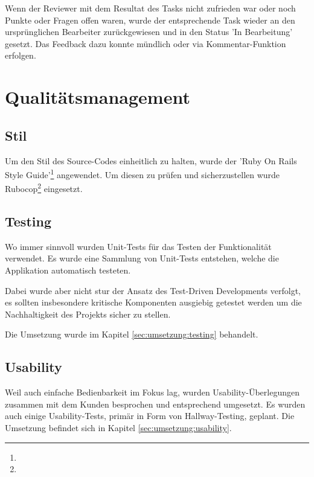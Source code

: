 Wenn der Reviewer mit dem Resultat des Tasks nicht zufrieden war oder noch Punkte oder Fragen offen waren, wurde der entsprechende Task wieder an den ursprünglichen Bearbeiter zurückgewiesen und in den Status 'In Bearbeitung' gesetzt. Das Feedback dazu konnte mündlich oder via Kommentar-Funktion erfolgen.

\section{Qualitätsmanagement}

\subsection*{Stil}

Um den Stil des Source-Codes einheitlich zu halten, wurde der 'Ruby On Rails Style Guide'\footnote{} angewendet. Um diesen zu prüfen und sicherzustellen wurde Rubocop\footnote{} eingesetzt.

\subsection*{Testing}

Wo immer sinnvoll wurden Unit-Tests für das Testen der Funktionalität verwendet. Es wurde eine Sammlung von Unit-Tests entstehen, welche die Applikation automatisch testeten.

Dabei wurde aber nicht stur der Ansatz des Test-Driven Developments verfolgt, es sollten insbesondere kritische Komponenten ausgiebig getestet werden um die Nachhaltigkeit des Projekts sicher zu stellen.

Die Umsetzung wurde im Kapitel \ref{sec:umsetzung:testing} behandelt.

\subsection*{Usability}

Weil auch einfache Bedienbarkeit im Fokus lag, wurden Usability-Überlegungen zusammen mit dem Kunden besprochen und entsprechend umgesetzt. Es wurden auch einige Usability-Tests, primär in Form von Hallway-Testing, geplant. Die Umsetzung befindet sich in Kapitel \ref{sec:umsetzung:usability}.